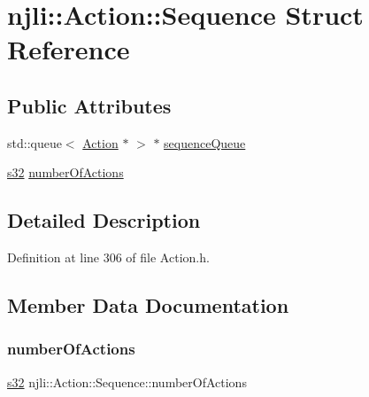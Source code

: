 \hypertarget{structnjli_1_1_action_1_1_sequence}{}\section{njli\+:\+:Action\+:\+:Sequence Struct Reference}
\label{structnjli_1_1_action_1_1_sequence}
\subsection*{Public Attributes}
\begin{DoxyCompactItemize}
\item 
std\+::queue$<$ \mbox{\hyperlink{classnjli_1_1_action}{Action}} $\ast$ $>$ $\ast$ \mbox{\hyperlink{structnjli_1_1_action_1_1_sequence_a58e1fef231bba3b8b0f2a679cd0e6abf}{sequence\+Queue}}
\item 
\mbox{\hyperlink{_util_8h_aa62c75d314a0d1f37f79c4b73b2292e2}{s32}} \mbox{\hyperlink{structnjli_1_1_action_1_1_sequence_aeb5ae53036c6785941c59a85c4bc9d2c}{number\+Of\+Actions}}
\end{DoxyCompactItemize}


\subsection{Detailed Description}


Definition at line 306 of file Action.\+h.



\subsection{Member Data Documentation}
\mbox{\label{structnjli_1_1_action_1_1_sequence_aeb5ae53036c6785941c59a85c4bc9d2c}} 
\subsubsection{\texorpdfstring{number\+Of\+Actions}{numberOfActions}}
{\footnotesize\ttfamily \mbox{\hyperlink{_util_8h_aa62c75d314a0d1f37f79c4b73b2292e2}{s32}} njli\+::\+Action\+::\+Sequence\+::number\+Of\+Actions}



